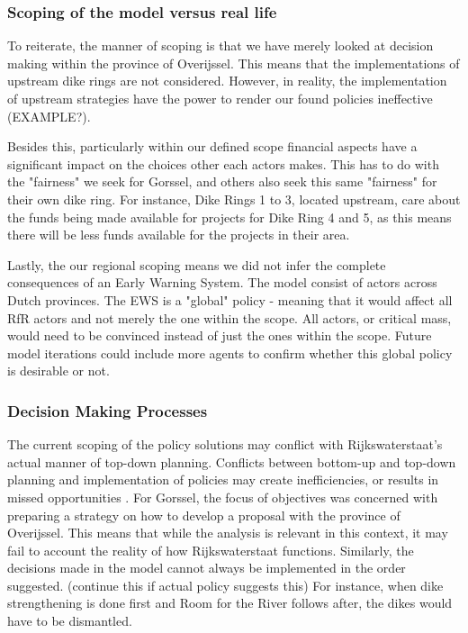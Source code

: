\subsubsection{Scoping of the model versus real life}
To reiterate, the manner of scoping is that we have merely looked at decision making within the province of Overijssel. This means that the implementations of upstream dike rings are not considered. However, in reality, the implementation of upstream strategies have the power to render our found policies ineffective (EXAMPLE?). 

Besides this, particularly within our defined scope financial aspects have a significant impact on the choices other each actors makes. This has to do with the "fairness" we seek for Gorssel, and others also seek this same "fairness" for their own dike ring. For instance, Dike Rings 1 to 3, located upstream, care about the funds being made available for projects for Dike Ring 4 and 5, as this means there will be less funds available for the projects in their area. 

Lastly, the our regional scoping means we did not infer the complete consequences of an Early Warning System. The model consist of actors across Dutch provinces. The EWS is a "global" policy - meaning that it would affect all RfR actors and not merely the one within the scope. All actors, or critical mass, would need to be convinced instead of just the ones within the scope. Future model iterations could include more agents to confirm whether this global policy is desirable or not.


\subsubsection{Decision Making Processes}
The current scoping of the policy solutions may conflict with Rijkswaterstaat's actual manner of top-down planning. Conflicts between bottom-up and top-down planning and implementation of policies may create inefficiencies, or results in missed opportunities \parencite{koontz_planning_2014}. For Gorssel, the focus of objectives was concerned with preparing a strategy on how to develop a proposal with the province of Overijssel. This means that while the analysis is relevant in this context, it may fail to account the reality of how Rijkswaterstaat functions. Similarly, the decisions made in the model cannot always be implemented in the order suggested. (continue this if actual policy suggests this) For instance, when dike strengthening is done first and Room for the River follows after, the dikes would have to be dismantled. 

